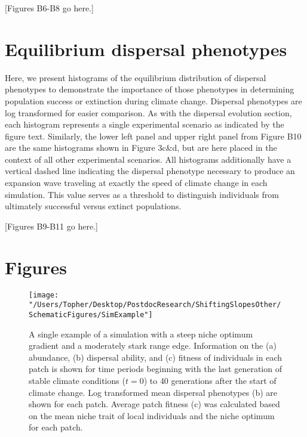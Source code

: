 \documentclass[11pt]{article}
\begin{document}
[Figures B6-B8 go here.]

\section*{Equilibrium dispersal phenotypes}
Here, we present histograms of the equilibrium distribution of dispersal phenotypes to demonstrate the importance of those phenotypes in determining population success or extinction during climate change. Dispersal phenotypes are log transformed for easier comparison. As with the dispersal evolution section, each histogram represents a single experimental scenario as indicated by the figure text. Similarly, the lower left panel and upper right panel from Figure B10 are the same histograms shown in Figure 3c\&d, but are here placed in the context of all other experimental scenarios. All histograms additionally have a vertical dashed line indicating the dispersal phenotype necessary to produce an expansion wave traveling at exactly the speed of climate change in each simulation. This value serves as a threshold to distinguish individuals from ultimately successful versus extinct populations.

[Figures B9-B11 go here.]

\newpage{}





\newpage{}

\section*{Figures}

\begin{figure}[h!]
\texttt{[image: "/Users/Topher/Desktop/PostdocResearch/ShiftingSlopesOther/SchematicFigures/SimExample"]}
\caption{A single example of a simulation with a steep niche optimum gradient and a moderately stark range edge. Information on the (a) abundance, (b) dispersal ability, and (c) fitness of individuals in each patch is shown for time periods beginning with the last generation of stable climate conditions ($t = 0$) to $40$ generations after the start of climate change. Log transformed mean dispersal phenotypes (b) are shown for each patch. Average patch fitness (c) was calculated based on the mean niche trait of local individuals and the niche optimum for each patch.}
\label{fig:SimExample}
\end{figure}
\end{document}

